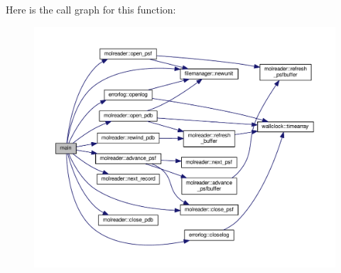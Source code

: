 Here is the call graph for this function\+:\nopagebreak
\begin{figure}[H]
\begin{center}
\leavevmode
\includegraphics[width=350pt]{share_2examples_2molreader_2system__driver_8f90_a8ec2266d83cd6c0b762cbcbc92c0af3d_cgraph}
\end{center}
\end{figure}


